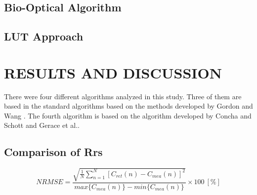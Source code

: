 \documentclass[draft]{spie}  %
\begin{document}
\subsection{Bio-Optical Algorithm}
\subsection{LUT Approach}
\section{RESULTS AND DISCUSSION}
\label{sec:results}  %

There were four different algorithms analyzed in this study. Three of them are based in the standard algorithms based on the methods developed by Gordon and Wang \cite{Gordon:1994}. The fourth algorithm is based on the algorithm developed by Concha and Schott\cite{Concha2014SPIE} and Gerace et al.\cite{Gerace:2012}.
\subsection{Comparison of Rrs}

\begin{equation}
\label{eq:NRMSE}
	NRMSE =\frac{\sqrt{\frac{1}{N}\sum_{n=1}^N{\left[C_{ret}(n) - C_{mea}(n)\right]^2}}}{max\{C_{mea}(n)\} - min\{C_{mea}(n)\}}\times100 ~[\%]
\end{equation}
\end{document}

